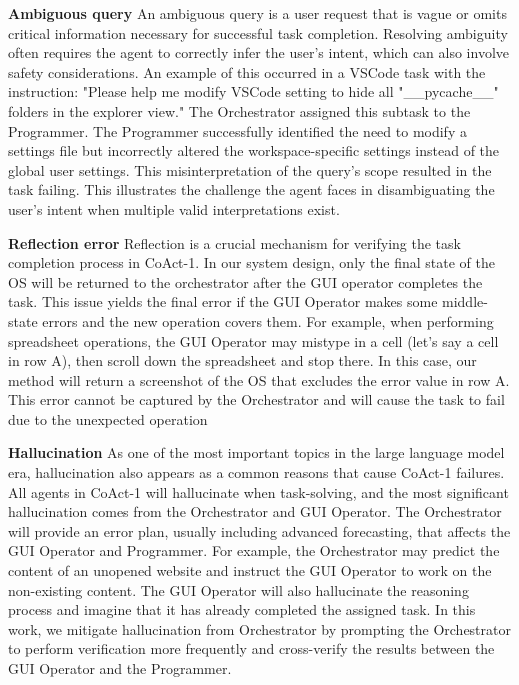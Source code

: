 \documentclass{article} %
\newcommand{\ours}{CoAct-1\xspace}
\begin{document}
\textbf{Ambiguous query} 
An ambiguous query is a user request that is vague or omits critical information necessary for successful task completion. Resolving ambiguity often requires the agent to correctly infer the user's intent, which can also involve safety considerations.
An example of this occurred in a VSCode task with the instruction: "Please help me modify VSCode setting to hide all "\_\_pycache\_\_" folders in the explorer view." The Orchestrator assigned this subtask to the Programmer. The Programmer successfully identified the need to modify a settings file but incorrectly altered the workspace-specific settings instead of the global user settings. This misinterpretation of the query's scope resulted in the task failing. This illustrates the challenge the agent faces in disambiguating the user's intent when multiple valid interpretations exist.

\textbf{Reflection error} 
Reflection is a crucial mechanism for verifying the task completion process in \ours. In our system design, only the final state of the OS will be returned to the orchestrator after the GUI operator completes the task. This issue yields the final error if the GUI Operator makes some middle-state errors and the new operation covers them. For example, when performing spreadsheet operations, the GUI Operator may mistype in a cell (let's say a cell in row A), then scroll down the spreadsheet and stop there. In this case, our method will return a screenshot of the OS that excludes the error value in row A. This error cannot be captured by the Orchestrator and will cause the task to fail due to the unexpected operation

\textbf{Hallucination} 
As one of the most important topics in the large language model era, hallucination also appears as a common reasons that cause \ours failures. All agents in \ours will hallucinate when task-solving, and the most significant hallucination comes from the Orchestrator and GUI Operator.
The Orchestrator will provide an error plan, usually including advanced forecasting, that affects the GUI Operator and Programmer. For example, the Orchestrator may predict the content of an unopened website and instruct the GUI Operator to work on the non-existing content. The GUI Operator will also hallucinate the reasoning process and imagine that it has already completed the assigned task. In this work, we mitigate hallucination from Orchestrator by prompting the Orchestrator to perform verification more frequently and cross-verify the results between the GUI Operator and the Programmer. 
\end{document}
